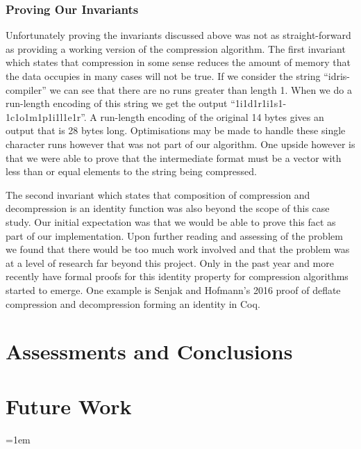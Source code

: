 \documentclass[a4paper, notitlepage]{report}
\begin{document}
\subsection{Proving Our Invariants}
\label{sec:orgb162665}
Unfortunately proving the invariants discussed above was not as straight-forward
as providing a working version of the compression algorithm. The first invariant
which states that compression in some sense reduces the amount of memory that
the data occupies in many cases will not be true. If we consider the string
``idris-compiler'' we can see that there are no runs greater than length 1. When
we do a run-length encoding of this string we get the output
``1i1d1r1i1s1-1c1o1m1p1i1l1e1r''. A run-length encoding of the original 14 bytes
gives an output that is 28 bytes long. Optimisations may be made to handle these
single character runs however that was not part of our algorithm. One upside
however is that we were able to prove that the intermediate format must be a
vector with less than or equal elements to the string being compressed.

The second invariant which states that composition of compression and
decompression is an identity function was also beyond the scope of this case
study. Our initial expectation was that we would be able to prove this fact as
part of our implementation. Upon further reading and assessing of the problem we
found that there would be too much work involved and that the problem was at a
level of research far beyond this project. Only in the past year and more
recently have formal proofs for this identity property for compression
algorithms started to emerge. One example is Senjak and Hofmann's 2016 proof
\cite{senjak_deflate_2016} of deflate compression and decompression forming an
identity in Coq.
\chapter{Assessments and Conclusions}
\label{sec:org1684a77}
\chapter{Future Work}
\label{sec:org6fb17ee}

\emergencystretch=1em
\printbibliography[heading=bibintoc, title=References]
\appendix
\end{document}
